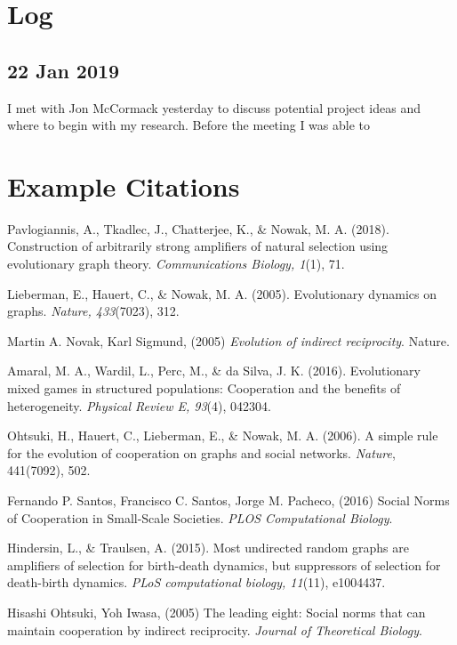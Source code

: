 \documentclass[10pt,a4paper]{article}
\begin{document}
\pagebreak
\section{Log}

\subsection{22 Jan 2019}

I met with Jon McCormack yesterday to discuss potential project ideas and where to begin with my research.
Before the meeting I was able to

\section{Example Citations}
\cite{novak indirect reciprocity}
\cite{leading eight}
\cite{leading eight,novak indirect reciprocity,social norms small scale society}

\pagebreak

\begin{thebibliography}{9}

Pavlogiannis, A., Tkadlec, J., Chatterjee, K., \& Nowak, M. A. (2018). Construction of arbitrarily strong amplifiers of natural selection using evolutionary graph theory. \textit{Communications Biology, 1}(1), 71.

Lieberman, E., Hauert, C., \& Nowak, M. A. (2005). Evolutionary dynamics on graphs. \textit{Nature, 433}(7023), 312.
	
Martin A. Novak, Karl Sigmund, (2005) 
\textit{Evolution of indirect reciprocity}. 
Nature.

\bibitem{}
Amaral, M. A., Wardil, L., Perc, M., \& da Silva, J. K. (2016). Evolutionary mixed games in structured populations: Cooperation and the benefits of heterogeneity. 
\textit{Physical Review E, 93}(4), 042304.

Ohtsuki, H., Hauert, C., Lieberman, E., \& Nowak, M. A. (2006). A simple rule for the evolution of cooperation on graphs and social networks. \textit{Nature}, 441(7092), 502.

Fernando P. Santos, Francisco C. Santos, Jorge M. Pacheco, (2016) 
Social Norms of Cooperation in Small-Scale Societies.
\textit{PLOS Computational Biology}.

Hindersin, L., \& Traulsen, A. (2015). Most undirected random graphs are amplifiers of selection for birth-death dynamics, but suppressors of selection for death-birth dynamics.
\textit{PLoS computational biology, 11}(11), e1004437.

Hisashi Ohtsuki, Yoh Iwasa, (2005) 
The leading eight: Social norms that can maintain cooperation by indirect reciprocity.
\textit{Journal of Theoretical Biology}.


\end{thebibliography}
\end{document}
